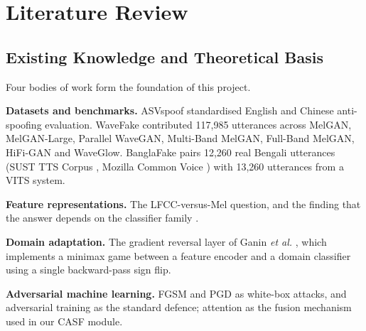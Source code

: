 \documentclass[conference]{IEEEtran}
\begin{document}
\section{Literature Review}

\subsection{Existing Knowledge and Theoretical Basis}
Four bodies of work form the foundation of this project.

\textbf{Datasets and benchmarks.} ASVspoof \cite{todisco2019asvspoof}
standardised English and Chinese anti-spoofing evaluation. WaveFake
\cite{frank2021wavefake} contributed 117,985 utterances across MelGAN,
MelGAN-Large, Parallel WaveGAN, Multi-Band MelGAN, Full-Band MelGAN, HiFi-GAN
and WaveGlow. BanglaFake \cite{fahad2025banglafake} pairs 12,260 real Bengali
utterances (SUST TTS Corpus \cite{ahmad2021sust}, Mozilla Common Voice
\cite{ardila2020commonvoice}) with 13,260 utterances from a VITS
\cite{kim2021vits} system.

\textbf{Feature representations.} The LFCC-versus-Mel question, and the
finding that the answer depends on the classifier family
\cite{frank2021wavefake,ahmed2026melspec}.

\textbf{Domain adaptation.} The gradient reversal layer of Ganin \emph{et al.}
\cite{ganin2016dann}, which implements a minimax game between a feature
encoder and a domain classifier using a single backward-pass sign flip.

\textbf{Adversarial machine learning.} FGSM \cite{goodfellow2015fgsm} and PGD
\cite{madry2018pgd} as white-box attacks, and adversarial training as the
standard defence; attention \cite{vaswani2017attention} as the fusion
mechanism used in our CASF module.
\end{document}
